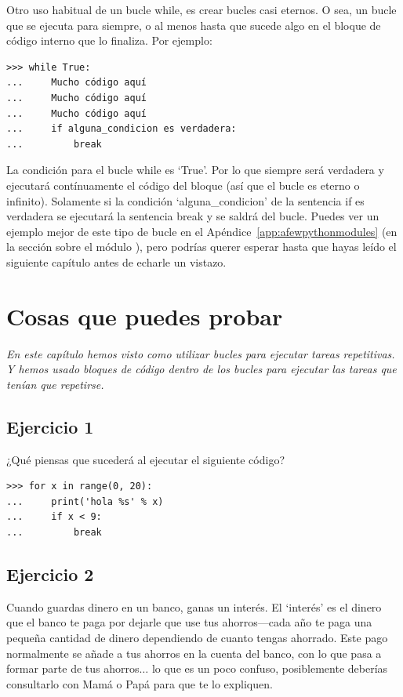 Otro uso habitual de un bucle while, es crear bucles casi eternos. O sea, un bucle que se ejecuta para siempre, o al menos hasta que sucede algo en el bloque de código interno que lo finaliza. Por ejemplo:

\begin{listingignore}
\begin{verbatim}
>>> while True:
...     Mucho código aquí
...     Mucho código aquí
...     Mucho código aquí
...     if alguna_condicion es verdadera:
...         break
\end{verbatim}
\end{listingignore}

La condición para el bucle while es `True'.  Por lo que siempre será verdadera y ejecutará contínuamente el código del bloque (así que el bucle es eterno o infinito). Solamente si la condición `alguna\_condicion' de la sentencia if es verdadera se ejecutará la sentencia break y se saldrá del bucle. Puedes ver un ejemplo mejor de este tipo de bucle en el Apéndice~\ref{app:afewpythonmodules} (en la sección sobre el módulo ), pero podrías querer esperar hasta que hayas leído el siguiente capítulo antes de echarle un vistazo.

\section{Cosas que puedes probar}

\emph{En este capítulo hemos visto como utilizar bucles para ejecutar tareas repetitivas.  Y hemos usado bloques de código dentro de los bucles para ejecutar las tareas que tenían que repetirse.}

\subsection*{Ejercicio 1}
¿Qué piensas que sucederá al ejecutar el siguiente código?

\begin{listing}
\begin{verbatim}
>>> for x in range(0, 20):
...     print('hola %s' % x)
...     if x < 9:
...         break
\end{verbatim}
\end{listing}

\subsection*{Ejercicio 2}
Cuando guardas dinero en un banco, ganas un interés.  El `interés' es el dinero que el banco te paga por dejarle que use tus ahorros---cada año te paga una pequeña cantidad de dinero dependiendo de cuanto tengas ahorrado.  Este pago normalmente se añade a tus ahorros en la cuenta del banco, con lo que pasa a formar parte de tus ahorros$\ldots$ lo que es un poco confuso, posiblemente deberías consultarlo con Mamá o Papá para que te lo expliquen.

